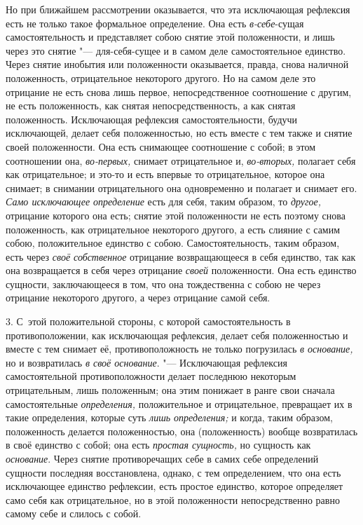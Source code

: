 Но при ближайшем рассмотрении оказывается, что эта исключающая рефлексия
есть не только такое формальное определение. Она есть
{\em в-себе}{}-сущая самостоятельность и представляет
собою снятие этой положенности, и лишь через это снятие "--- для-себя-сущее и
в самом деле самостоятельное единство. Через снятие инобытия или
положенности оказывается, правда, снова наличной положенность,
отрицательное некоторого другого. Но на самом деле это отрицание не есть
снова лишь первое, непосредственное соотношение с другим, не есть
положенность, как снятая непосредственность, а как снятая положенность.
Исключающая рефлексия самостоятельности, будучи исключающей, делает себя
положенностью, но есть вместе с тем также и снятие своей положенности. Она
есть снимающее соотношение с собой; в этом соотношении она,
{\em во-первых,} снимает отрицательное и,
{\em во-вторых,} полагает себя как отрицательное; и
это-то и есть впервые то отрицательное, которое она снимает; в снимании
отрицательного она одновременно и полагает и снимает его.
{\em Само исключающее определение} есть для себя, таким
образом, то {\em другое,} отрицание которого она есть;
снятие этой положенности не есть поэтому снова положенность, как
отрицательное некоторого другого, а есть слияние с самим собою,
положительное единство с собою. Самостоятельность, таким образом, есть
через {\em своё собственное} отрицание возвращающееся в
себя единство, так как она возвращается в себя через отрицание
{\em своей} положенности. Она есть единство сущности,
заключающееся в том, что она тождественна с собою не через отрицание
некоторого другого, а через отрицание самой себя.

3. С~этой положительной стороны, с которой самостоятельность в
противоположении, как исключающая рефлексия, делает себя положенностью и
вместе с тем снимает её, противоположность не только погрузилась
{\em в основание,} но и возвратилась
{\em в своё основание}. "--- Исключающая рефлексия
самостоятельной противоположности делает последнюю некоторым отрицательным,
лишь положенным; она этим понижает в ранге свои сначала самостоятельные
{\em определения,} положительное и отрицательное,
превращает их в такие определения, которые суть
{\em лишь определения;} и когда, таким образом,
положенность делается положенностью, она (положенность) вообще возвратилась
в своё единство с собой; она есть {\em простая
сущность,} но сущность как {\em основание}. Через
снятие противоречащих себе в самих себе определений сущности последняя
восстановлена, однако, с тем определением, что она есть исключающее
единство рефлексии, есть простое единство, которое определяет само себя как
отрицательное, но в этой положенности непосредственно равно самому себе и
слилось с собой.

